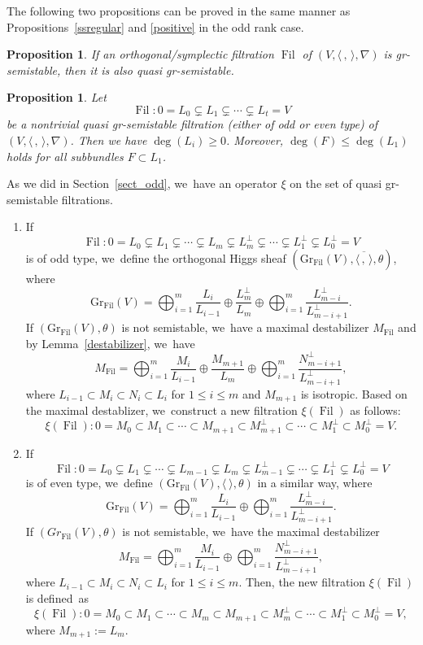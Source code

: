 \documentclass[11pt]{article}
\numberwithin{equation}{section}
\newcommand{\grsemistable}{gr\nobreakdash-semi\-stable\xspace}
\DeclareMathOperator{\Filt}{Fil}
\newcommand{\Gr}{\mathrm{Gr}}
\theoremstyle{plain}
\newtheorem{prop}[thm]{Proposition}
\theoremstyle{definition}
\begin{document}
The following two propositions can be proved in the same manner as Propositions~\ref{ssregular} and \ref{positive} in the odd rank case.

\begin{prop}\label{prop_ssregular_even}
If an orthogonal/symplectic filtration $\Filt$ of $(V,\langle \,, \, \rangle,\nabla)$ is \grsemistable, then it is also quasi \grsemistable.
\end{prop}

\begin{prop}\label{positiveeven}
Let
\[
\Filt: 0= L_0 \subsetneq L_1 \subsetneq \cdots \subsetneq L_t = V
\]
be a nontrivial quasi \grsemistable filtration (either of odd or even type) of $(V,\langle \,, \, \rangle,\nabla)$. Then we have $\deg(L_i)\geq 0$. Moreover, $\deg(F)\leq \deg(L_1)$ holds for all subbundles $F\subset L_1$.
\end{prop}

As we did in Section~\ref{sect_odd}, we~have an operator $\xi$ on the set of quasi \grsemistable filtrations.
\begin{enumerate}
\item If
\[
\Filt: 0= L_0 \subsetneq L_1 \subsetneq \cdots \subsetneq L_m \subsetneq L_m^\perp\subsetneq\cdots \subsetneq L_1^\perp\subsetneq L_0^\perp= V
\]
is of odd type, we~define the orthogonal Higgs sheaf $(\Gr_{\Filt}(V), \overline{\langle \,, \, \rangle},\theta)$, where
\[
\Gr_{\Filt}(V)=\mathop{\bigoplus}_{i=1}^{m} \frac{L_i}{L_{i-1}}\oplus \frac{L_m^\perp}{L_m}\oplus \mathop{\bigoplus}_{i=1}^{m} \frac{L_{m-i}^\perp}{L_{m-i+1}^\perp}.
\]
If $(\Gr_{\Filt}(V),\theta)$ is not semistable, we~have a maximal destabilizer $M_{\Filt}$ and by Lem\-ma~\ref{destabilizer}, we~have
\[
M_{\Filt}=\mathop{\bigoplus}_{i=1}^{m} \frac{M_i}{L_{i-1}}\oplus \frac{M_{m+1}}{L_m}\oplus \mathop{\bigoplus}_{i=1}^{m} \frac{N_{m-i+1}^\perp}{L_{m-i+1}^\perp},
\]
where $L_{i-1}\subset M_i\subset N_i\subset L_i$ for $1\leq i\leq m$ and $M_{m+1}$ is isotropic. Based on the maximal destablizer, we~construct a new filtration $\xi(\Filt)$ as follows:
\[
\xi(\Filt):0=M_0\subset M_1\subset\cdots\subset M_{m+1}\subset M_{m+1}^\perp\subset\cdots\subset M_1^\perp\subset M_0^\perp=V.
\]

\item If
\[
\Filt: 0= L_0 \subsetneq L_1 \subsetneq \cdots\subsetneq L_{m-1} \subsetneq L_m \subsetneq L_{m-1}^\perp\subsetneq\cdots \subsetneq L_1^\perp\subsetneq L_0^\perp= V
\]
is of even type, we~define $(\Gr_{\Filt}(V),\langle \ \rangle,\theta)$ in a similar way, where
\[
\Gr_{\Filt}(V)=\mathop{\bigoplus}_{i=1}^{m} \frac{L_i}{L_{i-1}}\oplus \mathop{\bigoplus}_{i=1}^{m} \frac{L_{m-i}^\perp}{L_{m-i+1}^\perp}.
\]
If $(Gr_{\Filt}(V),\theta)$ is not semistable, we~have the maximal destabilizer
\[
M_{\Filt}=\mathop{\bigoplus}_{i=1}^{m} \frac{M_i}{L_{i-1}}\oplus \mathop{\bigoplus}_{i=1}^{m} \frac{N_{m-i+1}^\perp}{L_{m-i+1}^\perp},
\]
where $L_{i-1}\subset M_i\subset N_i\subset L_i$ for $1\leq i\leq m$. Then, the new filtration $\xi(\Filt)$ is defined~as
\[
\xi(\Filt):0=M_0\subset M_1\subset\cdots\subset M_m \subset M_{m+1}\subset M_m^\perp\subset\cdots\subset M_1^\perp\subset M_0^\perp=V,
\]
where $M_{m+1}:=L_m$.
\end{enumerate}
\end{document}
